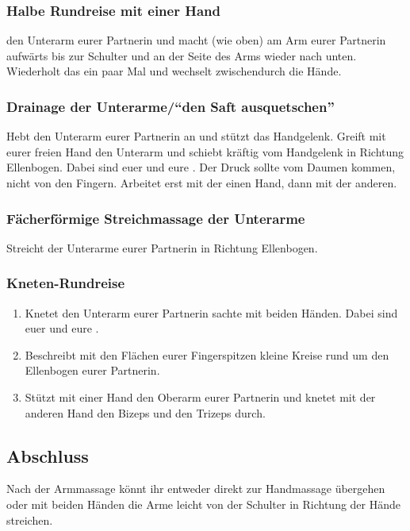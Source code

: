 \pagebreak
\subsubsection{Halbe Rundreise mit einer Hand}
 den Unterarm eurer Partnerin und macht  (wie oben) am Arm eurer Partnerin aufwärts bis zur Schulter und an der Seite des Arms wieder nach unten. Wiederholt das ein paar Mal und wechselt zwischendurch die Hände.

\subsubsection{Drainage der Unterarme/"`den Saft ausquetschen"'}
Hebt den Unterarm eurer Partnerin an und stützt das Handgelenk. Greift mit eurer freien Hand den Unterarm und schiebt kräftig vom Handgelenk in Richtung Ellenbogen. Dabei sind euer  und eure . Der Druck sollte vom Daumen kommen, nicht von den Fingern. Arbeitet erst mit der einen Hand, dann mit der anderen.

\subsubsection{Fächerförmige Streichmassage der Unterarme}
Streicht  der Unterarme eurer Partnerin in Richtung Ellenbogen.

\subsubsection{Kneten-Rundreise}
\begin{oframed}
  \begin{enumerate}
    \item {} Knetet den Unterarm eurer Partnerin sachte mit beiden Händen. Dabei sind euer  und eure .
    \item {} Beschreibt mit den Flächen eurer Fingerspitzen kleine Kreise rund um den Ellenbogen eurer Partnerin.
    \item {} Stützt mit einer Hand den Oberarm eurer Partnerin und knetet mit der anderen Hand den Bizeps und den Trizeps durch.
  \end{enumerate}
\end{oframed}

\subsection{Abschluss}
Nach der Armmassage könnt ihr entweder direkt zur Handmassage übergehen oder mit beiden Händen die Arme leicht von der Schulter in Richtung der Hände streichen.
